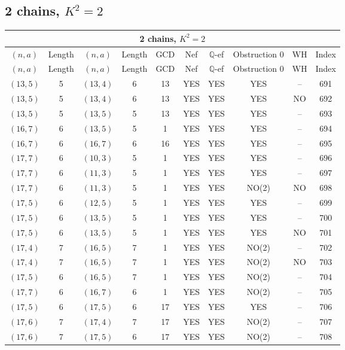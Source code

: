 \subsection{2 chains, $K^2 = 2$}
\begin{longtable}{|c|c|c|c|c|c|c|c|c|c|}
\hline
\multicolumn{10}{|c|}{2 chains, $K^2 = 2$}\\
\hline
$(n,a)$ & Length & $(n,a)$ & Length & GCD & Nef & $\mathbb Q$-ef & Obstruction 0 & WH & Index\\
\hline
\endfirsthead

\hline
$(n,a)$ & Length & $(n,a)$ & Length & GCD & Nef & $\mathbb Q$-ef & Obstruction 0 & WH & Index\\
\hline
\endhead
\hline
\endfoot

$(13, 5)$ & 5 & $(13, 4)$ & 6 & 13 & YES & YES & YES & -- & 691\\
$(13, 5)$ & 5 & $(13, 4)$ & 6 & 13 & YES & YES & YES & NO & 692\\
$(13, 5)$ & 5 & $(13, 5)$ & 5 & 13 & YES & YES & YES & -- & 693\\
$(16, 7)$ & 6 & $(13, 5)$ & 5 & 1 & YES & YES & YES & -- & 694\\
$(16, 7)$ & 6 & $(16, 7)$ & 6 & 16 & YES & YES & YES & -- & 695\\
$(17, 7)$ & 6 & $(10, 3)$ & 5 & 1 & YES & YES & YES & -- & 696\\
$(17, 7)$ & 6 & $(11, 3)$ & 5 & 1 & YES & YES & YES & -- & 697\\
$(17, 7)$ & 6 & $(11, 3)$ & 5 & 1 & YES & YES & NO(2) & NO & 698\\
$(17, 5)$ & 6 & $(12, 5)$ & 5 & 1 & YES & YES & YES & -- & 699\\
$(17, 5)$ & 6 & $(13, 5)$ & 5 & 1 & YES & YES & YES & -- & 700\\
$(17, 5)$ & 6 & $(13, 5)$ & 5 & 1 & YES & YES & YES & NO & 701\\
$(17, 4)$ & 7 & $(16, 5)$ & 7 & 1 & YES & YES & NO(2) & -- & 702\\
$(17, 4)$ & 7 & $(16, 5)$ & 7 & 1 & YES & YES & NO(2) & NO & 703\\
$(17, 5)$ & 6 & $(16, 5)$ & 7 & 1 & YES & YES & NO(2) & -- & 704\\
$(17, 7)$ & 6 & $(16, 7)$ & 6 & 1 & YES & YES & NO(2) & -- & 705\\
$(17, 5)$ & 6 & $(17, 5)$ & 6 & 17 & YES & YES & YES & -- & 706\\
$(17, 6)$ & 7 & $(17, 4)$ & 7 & 17 & YES & YES & NO(2) & -- & 707\\
$(17, 6)$ & 7 & $(17, 5)$ & 6 & 17 & YES & YES & NO(2) & -- & 708\\

\end{longtable}
